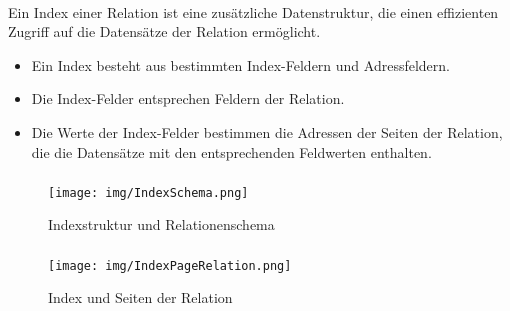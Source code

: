 \begin{frame}{\insertsection}
\framesubtitle{\insertsubsection}	
\begin{definition}[Index]
	Ein Index einer Relation ist eine zus\"atzliche Datenstruktur, die einen effizienten Zugriff auf die Datens\"atze der Relation
	erm\"oglicht. 
	\pause
	\begin{itemize}
		\item Ein Index besteht aus bestimmten Index-Feldern und Adressfeldern.
		\item	Die Index-Felder entsprechen Feldern der Relation. 
		\item Die Werte der Index-Felder bestimmen die Adressen der Seiten der Relation, die die Datens\"atze 
		mit den entsprechenden Feldwerten enthalten. 
	\end{itemize}
\end{definition}		
\end{frame}

\begin{frame}{\insertsection}
\framesubtitle{\insertsubsection}
\begin{figure}
	\texttt{[image: img/IndexSchema.png]}
	\\[-10pt]\caption{Indexstruktur und Relationenschema}
\end{figure}
\end{frame}

\begin{frame}{\insertsection}
\framesubtitle{\insertsubsection}
\begin{figure}
\texttt{[image: img/IndexPageRelation.png]}
\\[-10pt]\caption{Index und Seiten der Relation}
\end{figure}
\end{frame}

